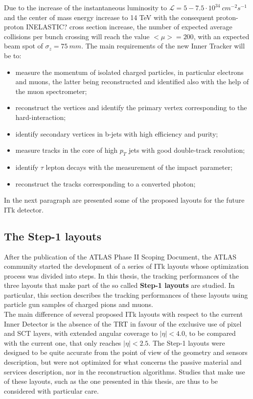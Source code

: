 \documentclass[a4paper,twoside,12pt]{article}
\begin{document}
Due to the increase of the instantaneous luminosity to $\mathcal{L} = 5 - 7.5 \cdot 10^{34}\ cm^{-2}s^{-1}$ and the center of mass energy increase to 
14 TeV with the consequent proton-proton INELASTIC? cross section increase, the number of expected average collisions per bunch crossing will 
reach the value $<\mu> = 200$, with an expected beam spot of $\sigma_{z} = 75\ mm$. The main requirements of the new Inner Tracker will be to:

\begin{itemize}
\item measure the momentum of isolated charged particles, in particular electrons and muons, the latter being reconstructed and identified also with
the help of the muon spectrometer;
\item reconstruct the vertices and identify the primary vertex corresponding to the hard-interaction;
\item identify secondary vertices in b-jets with high efficiency and purity;
\item measure tracks in the core of high $p_{T}$ jets with good double-track resolution;
\item identify $\tau$ lepton decays with the measurement of the impact parameter;
\item reconstruct the tracks corresponding to a converted photon;
\end{itemize}

In the next paragraph are presented some of the proposed layouts for the future ITk detector.

\subsection{The Step-1 layouts}
After the publication of the ATLAS Phase II Scoping Document\cite{scoping}, the ATLAS community 
started the development of a series of ITk layouts whose optimization process was divided into steps. In this thesis, the
tracking performances of the three layouts that make part of the so called \textbf{Step-1 layouts} are studied. In particular,
this section describes the tracking performances of these layouts using particle gun samples of charged
pions and muons.\\

The main difference of several proposed ITk layouts with respect
to the current Inner Detector is the absence of the TRT in favour of the exclusive use of
pixel and SCT layers, with extended angular coverage to $|\eta| < 4.0$, to be compared
with the current one, that only reaches $|\eta| < 2.5$. The Step-1 layouts were designed to 
be quite accurate from the point of view of the geometry and sensors description, but
were not optimized for what concerns the passive material and services description, nor in the
reconstruction algorithms. Studies that make use of these layouts, such as the one presented
in this thesis, are thus to be considered with particular care. \\
\end{document}
